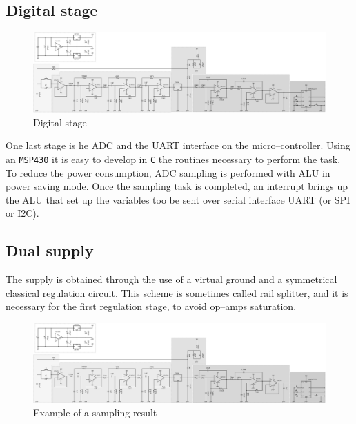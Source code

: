 \subsection{Digital stage}
\begin{figure}[h]
	\centering
	\includegraphics*[viewport=2320 3 2650 350,scale=0.4]{ch2/img/receiver3.pdf}
	\caption{Digital stage}
	\label{fig:adc}
\end{figure}
One last stage is he ADC and the UART interface on the micro--controller. Using an \texttt{MSP430} it is easy to develop in \texttt{C} the routines necessary to perform the task. To reduce the power consumption, ADC sampling is performed with ALU in power saving mode. Once the sampling task is completed, an interrupt brings up the ALU that set up the variables too be sent over serial interface UART (or SPI or I2C).

\subsection{Dual supply}
The supply is obtained through the use of a virtual ground and a symmetrical classical regulation circuit. This scheme is sometimes called rail splitter, and it is necessary for the first regulation stage, to avoid op--amps saturation.
\begin{figure}[h]
	\centering
	\includegraphics*[viewport=3 450 580 750,scale=0.4]{ch2/img/receiver3.pdf}
	\caption{Example of a sampling result}
	\label{fig:sampling_res}
	\forceversofloat
\end{figure}

